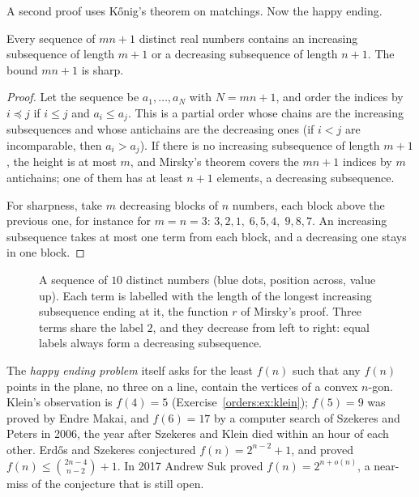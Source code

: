 A second proof uses K\H onig's theorem on matchings. Now
the happy ending.

\begin{theorem}\label{orders:thm:es}
Every sequence of $mn+1$ distinct real numbers contains an increasing subsequence of length $m+1$ or a decreasing
subsequence of length $n+1$. The bound $mn+1$ is sharp.
\end{theorem}
\begin{proof}
Let the sequence be $a_1,\dots,a_N$ with $N=mn+1$, and order the indices by $i\preceq j$ if $i\le j$ and $a_i\le a_j$. This is a partial order whose
chains are the increasing subsequences and whose antichains are the decreasing ones (if $i<j$ are incomparable, then
$a_i>a_j$). If there is no increasing subsequence of length $m+1$, the height is at most $m$, and Mirsky's theorem covers the $mn+1$
indices by $m$ antichains; one of them has at least $n+1$ elements, a decreasing subsequence.

For sharpness, take $m$ decreasing blocks of $n$ numbers, each block above the previous one, for instance for $m=n=3$:
$3,2,1,\;6,5,4,\;9,8,7$. An increasing subsequence takes at most one term from each block, and a decreasing one stays in one
block.
\end{proof}

\begin{figure}[ht]
\centering
{}
\caption{A sequence of $10$ distinct numbers (blue dots, position across, value up). Each term is labelled with the
length of the longest increasing subsequence ending at it, the function $r$ of Mirsky's proof. Three terms share
the label $2$, and they decrease from left to right: equal labels always form a decreasing subsequence.}
\label{orders:fig:es}
\end{figure}

\begin{remark}
The \emph{happy ending problem} itself asks for the least $f(n)$ such that any $f(n)$ points in the plane, no three on a line,
contain the vertices of a convex $n$-gon. Klein's observation is $f(4)=5$ (Exercise~\ref{orders:ex:klein}); $f(5)=9$ was proved by Endre Makai, and $f(6)=17$ by a computer search of Szekeres and Peters in 2006, the year after Szekeres and Klein died within an
hour of each other. Erd\H os and Szekeres conjectured $f(n)=2^{n-2}+1$, and proved $f(n)\le\binom{2n-4}{n-2}+1$. In 2017 Andrew Suk proved
$f(n)=2^{n+o(n)}$, a near-miss of the conjecture that is still open.
\end{remark}

